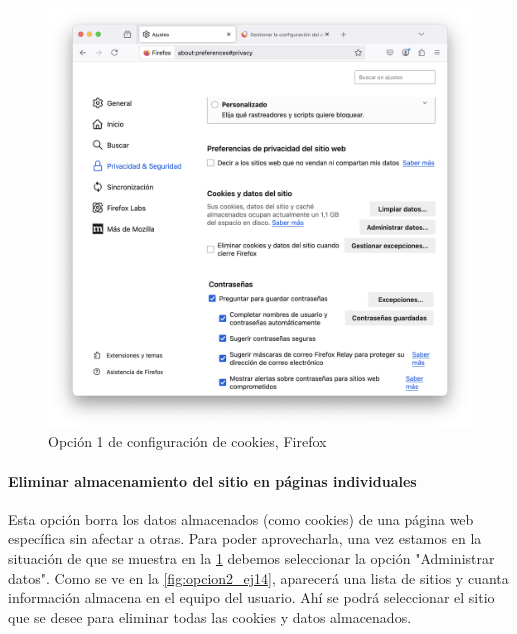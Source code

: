 \begin{figure}[H]   
    \centering
    \includegraphics[width=\textwidth]{opcion1_ej14.png}
    \caption{Opción 1 de configuración de cookies, Firefox}
    \label{fig:opcion1_ej14}
\end{figure}


\paragraph{Eliminar almacenamiento del sitio en páginas individuales }

Esta opción borra los datos almacenados (como cookies) de una página web específica sin afectar a otras. Para poder aprovecharla, una vez estamos en la situación de que se muestra en la \ref{fig:opcion1_ej14} debemos seleccionar la opción "Administrar datos". Como se ve en la \ref{fig:opcion2_ej14}, aparecerá una lista de sitios y cuanta información almacena en el equipo del usuario. Ahí se podrá seleccionar el sitio que se desee para eliminar todas las cookies y datos almacenados. 


